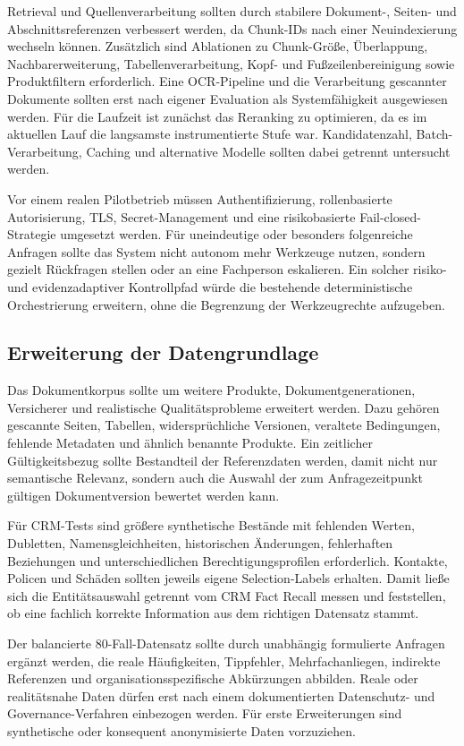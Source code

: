 Retrieval und Quellenverarbeitung sollten durch stabilere Dokument-, Seiten- und Abschnittsreferenzen verbessert werden, da Chunk-IDs nach einer Neuindexierung wechseln können. Zusätzlich sind Ablationen zu Chunk-Größe, Überlappung, Nachbarerweiterung, Tabellenverarbeitung, Kopf- und Fußzeilenbereinigung sowie Produktfiltern erforderlich. Eine OCR-Pipeline und die Verarbeitung gescannter Dokumente sollten erst nach eigener Evaluation als Systemfähigkeit ausgewiesen werden. Für die Laufzeit ist zunächst das Reranking zu optimieren, da es im aktuellen Lauf die langsamste instrumentierte Stufe war. Kandidatenzahl, Batch-Verarbeitung, Caching und alternative Modelle sollten dabei getrennt untersucht werden.

Vor einem realen Pilotbetrieb müssen Authentifizierung, rollenbasierte Autorisierung, TLS, Secret-Management und eine risikobasierte Fail-closed-Strategie umgesetzt werden. Für uneindeutige oder besonders folgenreiche Anfragen sollte das System nicht autonom mehr Werkzeuge nutzen, sondern gezielt Rückfragen stellen oder an eine Fachperson eskalieren. Ein solcher risiko- und evidenzadaptiver Kontrollpfad würde die bestehende deterministische Orchestrierung erweitern, ohne die Begrenzung der Werkzeugrechte aufzugeben.

\subsection{Erweiterung der Datengrundlage}

Das Dokumentkorpus sollte um weitere Produkte, Dokumentgenerationen, Versicherer und realistische Qualitätsprobleme erweitert werden. Dazu gehören gescannte Seiten, Tabellen, widersprüchliche Versionen, veraltete Bedingungen, fehlende Metadaten und ähnlich benannte Produkte. Ein zeitlicher Gültigkeitsbezug sollte Bestandteil der Referenzdaten werden, damit nicht nur semantische Relevanz, sondern auch die Auswahl der zum Anfragezeitpunkt gültigen Dokumentversion bewertet werden kann.

Für CRM-Tests sind größere synthetische Bestände mit fehlenden Werten, Dubletten, Namensgleichheiten, historischen Änderungen, fehlerhaften Beziehungen und unterschiedlichen Berechtigungsprofilen erforderlich. Kontakte, Policen und Schäden sollten jeweils eigene Selection-Labels erhalten. Damit ließe sich die Entitätsauswahl getrennt vom CRM Fact Recall messen und feststellen, ob eine fachlich korrekte Information aus dem richtigen Datensatz stammt.

Der balancierte 80-Fall-Datensatz sollte durch unabhängig formulierte Anfragen ergänzt werden, die reale Häufigkeiten, Tippfehler, Mehrfachanliegen, indirekte Referenzen und organisationsspezifische Abkürzungen abbilden. Reale oder realitätsnahe Daten dürfen erst nach einem dokumentierten Datenschutz- und Governance-Verfahren einbezogen werden. Für erste Erweiterungen sind synthetische oder konsequent anonymisierte Daten vorzuziehen.

